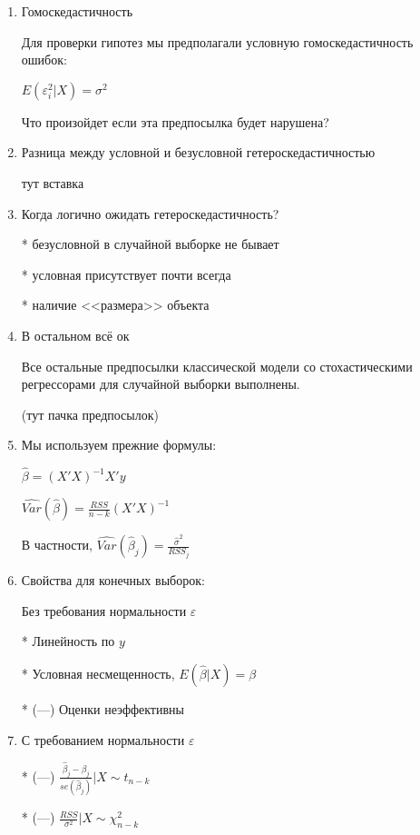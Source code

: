 \documentclass[12pt,a4paper]{article}
\begin{document}
{\Huge

\begin{enumerate}

\item Гомоскедастичность

Для проверки гипотез мы предполагали условную гомоскедастичность ошибок:

$ E(\varepsilon_i^2 | X)=\sigma^2 $

Что произойдет если эта предпосылка будет нарушена?

\item Разница между условной и безусловной гетероскедастичностью

тут вставка

\item Когда логично ожидать гетероскедастичность?

* безусловной в случайной выборке не бывает

* условная присутствует почти всегда

* наличие <<размера>> объекта

\item В остальном всё ок

Все остальные предпосылки классической модели со стохастическими регрессорами для случайной выборки выполнены.

(тут пачка предпосылок)

\newpage
\item  Мы используем прежние формулы:

$\hat{\beta}=(X'X)^{-1}X'y$

$\widehat{Var}(\hat{\beta})=\frac{RSS}{n-k}(X'X)^{-1}$

В частности, $\widehat{Var}(\hat{\beta}_j)=\frac{\hat{\sigma}^2}{RSS_j}$


\item Свойства для конечных выборок:

Без требования нормальности $\varepsilon$

* Линейность по $y$

* Условная несмещенность, $E(\hat{\beta}|X)=\beta$

* (---) Оценки неэффективны

\newpage
\item  С требованием нормальности $\varepsilon$

* (---) $\frac{\hat{\beta}_j-\beta_j}{se(\hat{\beta}_j)} | X \sim t_{n-k}$

* (---) $\frac{RSS}{\sigma^2} |X \sim \chi^2_{n-k}$


\end{enumerate}}
\end{document}
